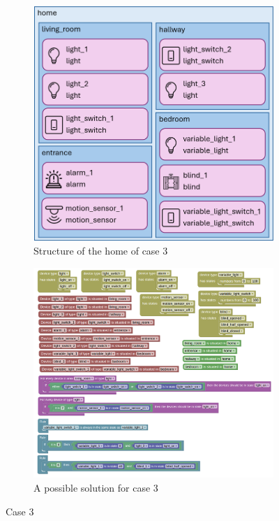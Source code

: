 \documentclass[11pt,a4paper]{report}
\begin{document}
\begin{figure}[htbp]
    \centering
    \begin{subfigure}[b]{0.6\linewidth}
        \centering
        \includegraphics[width=\linewidth]{images/case_3.png}
        \caption{Structure of the home of case 3}
        \label{fig:case_3}
    \end{subfigure}
    \hfill
    \begin{subfigure}[b]{1\linewidth}
        \centering
        \includegraphics[width=\linewidth]{images/case_3_homy.png}
        \caption{A possible solution for case 3}
        \label{fig:case_3_solution}
    \end{subfigure}
    \caption{Case 3}
    \label{fig:CASE_3}
\end{figure}
\end{document}
